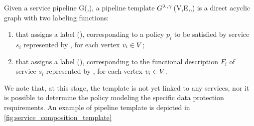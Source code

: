 \begin{definition} \label{def:template}
  Given a service pipeline G(\V,\E), a pipeline template $G^{\lambda\,,\gamma\,}$(V,E,\myLambda,\myGamma) is a direct acyclic graph with two labeling functions:
  \begin{enumerate}[label=\roman*)]
    \item \myLambda that assigns a label \myLambda(), corresponding to a policy $p_i$ to be satisfied by service $s_i$ represented by , for each vertex $v_{i}\in V$;
    \item \myGamma that assigns a label \myGamma(), corresponding to the functional description $F_i$ of service $s_i$ represented by , for each vertex $v_{i}\in V$.
  \end{enumerate}
\end{definition}

We note that, at this stage, the template is not yet linked to any services, nor it is possible to determine the policy modeling the specific data protection requirements. 
An example of pipeline template is depicted in \cref{fig:service_composition_template}


